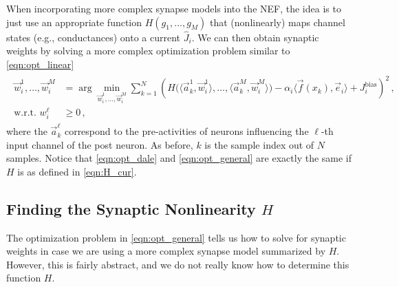 \documentclass[10pt,letterpaper,oneside]{article}
\begin{document}
When incorporating more complex synapse models into the NEF, the idea is to just use an appropriate function $H(g_1, \ldots, g_M)$ that (nonlinearly) maps channel states (e.g., conductances) onto a current $\hat J_i$. We can then obtain synaptic weights by solving a more complex optimization problem similar to \cref{eqn:opt_linear}
\begin{align}
	\begin{aligned}
	 \vec w^{1}_i, \ldots, \vec w^{M}_i  &= \arg\min_{\vec w^{1}_i, \ldots, \vec w^M_i } \sum_{k = 1}^N \left( H\big(\langle \vec a^1_k, \vec w^{1}_i \rangle, \ldots, \langle \vec a^M_k, \vec w^M_i \rangle \big) - \alpha_i \big\langle \vec f(x_k), \vec e_i \big\rangle + J^\mathrm{bias}_i \right)^2 \,,\\
	 \text{w.r.t. } w^\ell_i &\geq 0 \,,
	\end{aligned}
	\label{eqn:opt_general}
\end{align}
where the $\vec a^\ell_k$ correspond to the pre-activities of neurons influencing the $\ell$-th input channel of the post neuron. As before, $k$ is the sample index out of $N$ samples. Notice that \cref{eqn:opt_dale} and \cref{eqn:opt_general} are exactly the same if $H$ is as defined in \cref{eqn:H_cur}.

\subsection{Finding the Synaptic Nonlinearity $H$}
The optimization problem in \cref{eqn:opt_general} tells us how to solve for synaptic weights in case we are using a more complex synapse model summarized by $H$. However, this is fairly abstract, and we do not really know how to determine this function $H$.
\end{document}
